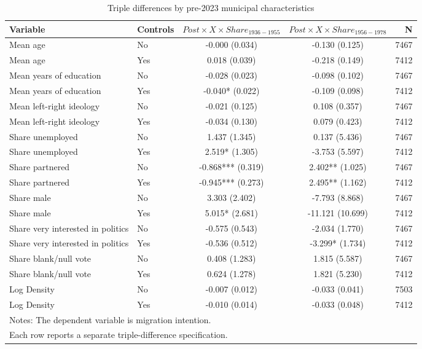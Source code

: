 \begin{table}[!htbp]
\centering
\caption{Triple differences by pre-2023 municipal characteristics}
\label{tab:triple_differences_key}
\small
\begin{tabular}{llccr}
\hline
Variable & Controls & $Post \times X \times Share_{1936-1955}$ & $Post \times X \times Share_{1956-1978}$ & N \\
\hline
Mean age & No & -0.000 (0.034) & -0.130 (0.125) & 7467 \\
Mean age & Yes & 0.018 (0.039) & -0.218 (0.149) & 7412 \\
Mean years of education & No & -0.028 (0.023) & -0.098 (0.102) & 7467 \\
Mean years of education & Yes & -0.040* (0.022) & -0.109 (0.098) & 7412 \\
Mean left-right ideology & No & -0.021 (0.125) & 0.108 (0.357) & 7467 \\
Mean left-right ideology & Yes & -0.034 (0.130) & 0.079 (0.423) & 7412 \\
Share unemployed & No & 1.437 (1.345) & 0.137 (5.436) & 7467 \\
Share unemployed & Yes & 2.519* (1.305) & -3.753 (5.597) & 7412 \\
Share partnered & No & -0.868*** (0.319) & 2.402** (1.025) & 7467 \\
Share partnered & Yes & -0.945*** (0.273) & 2.495** (1.162) & 7412 \\
Share male & No & 3.303 (2.402) & -7.793 (8.868) & 7467 \\
Share male & Yes & 5.015* (2.681) & -11.121 (10.699) & 7412 \\
Share very interested in politics & No & -0.575 (0.543) & -2.034 (1.770) & 7467 \\
Share very interested in politics & Yes & -0.536 (0.512) & -3.299* (1.734) & 7412 \\
Share blank/null vote & No & 0.408 (1.283) & 1.815 (5.587) & 7467 \\
Share blank/null vote & Yes & 0.624 (1.278) & 1.821 (5.230) & 7412 \\
Log Density & No & -0.007 (0.012) & -0.033 (0.041) & 7503 \\
Log Density & Yes & -0.010 (0.014) & -0.033 (0.048) & 7412 \\
\hline
\multicolumn{5}{l}{\footnotesize Notes: The dependent variable is migration intention.} \\
\multicolumn{5}{l}{\footnotesize Each row reports a separate triple-difference specification.} \\

\end{tabular}
\end{table}
